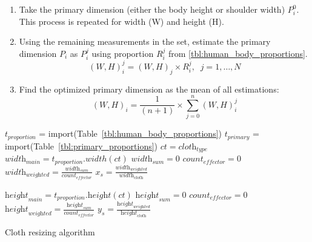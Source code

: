 \documentclass[number,preprint,review,12pt]{elsarticle}
\begin{document}
\clearpage

\begin{enumerate}
\item Take the primary dimension (either the body height or shoulder width) $P_i^0$. This process is repeated for width (W) and height (H).
\item Using the remaining measurements in the set, estimate the primary dimension $P_i$ as $P_i^j$ using proportion $R_i^j$ from \ref{tbl:human_body_proportions}.
\begin{equation}
(W,H)_i^j=(W,H)_j \times R_i^j, \;\; j=1, \ldots, N
\label{eqn:proportion_estimation}
\end{equation}
\item Find the optimized primary dimension as the mean of all estimations:
\begin{equation}
(W,H)_i=\frac{1}{(n+1)} \times \sum\limits_{j=0}^n (W,H)_i^j
\label{eqn:optimized_parameter}
\end{equation}
\end{enumerate}

\singlespacing

\begin{algorithm}
\DontPrintSemicolon 
{}
$t_\textit{proportion}$ = {\textrm import}({\textrm Table~\ref{tbl:human_body_proportions}}) \;
$t_\textit{primary}$ = {\textrm import}({\textrm Table~\ref{tbl:primary_proportions}}) \;
$ct=\textit{cloth}_\textit{type}$\;
$\textit{width}_\textit{main}=t_\textit{proportion}.width(ct)$\;
$\textit{width}_\textit{sum}=0$\;
$\textit{count}_\textit{effector}=0$\;
$\textit{width}_\textit{weighted}=\frac{\textit{width}_\textit{sum}}{\textit{count}_{\textit{effector}}}$\;
$x_s=\frac{\textit{width}_\textit{weighted}}{\textit{width}_\textit{cloth}}$\;

$\textit{height}_\textit{main}=t_\textit{proportion}.\textit{height}(ct)$\;
$\textit{height}_\textit{sum}=0$\;
$\textit{count}_\textit{effector}=0$\;
$\textit{height}_\textit{weighted}=\frac{\textit{height}_\textit{sum}}{\textit{count}_{\textit{effector}}}$\;
$y_s=\frac{\textit{height}_\textit{weighted}}{\textit{height}_\textit{cloth}}$\;
\caption{Cloth resizing algorithm}
\label{algo:cloth_resize}
\end{algorithm}
\end{document}
